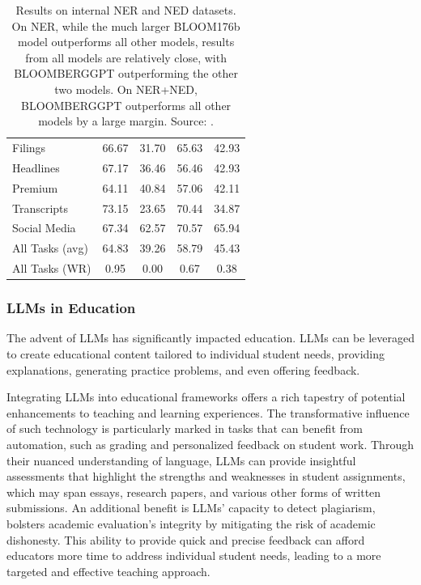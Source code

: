 \begin{table}[h!]
\begin{tabularx}{\textwidth}{Xcccc}
		Filings         & 66.67                 & 31.70             & 65.63                           & 42.93                              \\
		Headlines       & 67.17                 & 36.46             & 56.46                           & 42.93                              \\
		Premium         & 64.11                 & 40.84             & 57.06                           & 42.11                              \\
		Transcripts     & 73.15                 & 23.65             & 70.44                           & 34.87                              \\
		Social Media    & 67.34                 & 62.57             & 70.57                           & 65.94                              \\
		\midrule
		All Tasks (avg) & 64.83                 & 39.26             & 58.79                           & 45.43                              \\
		All Tasks (WR)  & 0.95                  & 0.00              & 0.67                            & 0.38                               \\
		\bottomrule
	\end{tabularx}
	\caption{Results on internal NER and NED datasets. On NER, while the much larger BLOOM176b model outperforms all other models, results from all models are relatively close, with BLOOMBERGGPT outperforming the other two models. On NER+NED, BLOOMBERGGPT outperforms all other models by a large margin. Source: \textcite{wu2023bloomberggpt}.}
	\label{tab:ner_ned_results}
\end{table}

\subsubsection{LLMs in Education}
\label{subsubsec:llms-in-education}

The advent of LLMs has significantly impacted education.
LLMs can be leveraged to create educational content tailored to individual student needs, providing explanations, generating practice problems, and even offering feedback.

Integrating LLMs into educational frameworks offers a rich tapestry of potential enhancements to teaching and learning experiences.
The transformative influence of such technology is particularly marked in tasks that can benefit from automation, such as grading and personalized feedback on student work.
Through their nuanced understanding of language, LLMs can provide insightful assessments that highlight the strengths and weaknesses in student assignments, which may span essays, research papers, and various other forms of written submissions.
An additional benefit is LLMs' capacity to detect plagiarism, bolsters academic evaluation's integrity by mitigating the risk of academic dishonesty.
This ability to provide quick and precise feedback can afford educators more time to address individual student needs, leading to a more targeted and effective teaching approach.

